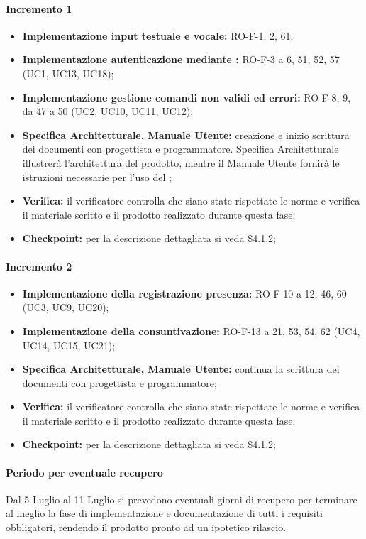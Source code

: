 \paragraph{Incremento 1}
\begin{itemize}
    \item \textbf{Implementazione input testuale e vocale:} RO-F-1, 2, 61;
    \item \textbf{Implementazione autenticazione mediante :} RO-F-3 a 6, 51, 52, 57 (UC1, UC13, UC18);
    \item \textbf{Implementazione gestione comandi non validi ed errori:} RO-F-8, 9, da 47 a 50 (UC2, UC10, UC11, UC12);
    \item \textbf{Specifica Architetturale, Manuale Utente:} creazione e inizio scrittura dei documenti con progettista e programmatore. Specifica Architetturale illustrerà l'architettura del prodotto, mentre il Manuale Utente fornirà le istruzioni necessarie per l'uso del ;
    \item \textbf{Verifica:} il verificatore controlla che siano state rispettate le norme e verifica il materiale scritto e il prodotto realizzato durante questa fase;
    \item \textbf{Checkpoint:} per la descrizione dettagliata si veda \$4.1.2;
\end{itemize}

\paragraph{Incremento 2}
\begin{itemize}
    \item \textbf{Implementazione della registrazione presenza:} RO-F-10 a 12, 46, 60 (UC3, UC9, UC20);
    \item \textbf{Implementazione della consuntivazione:} RO-F-13 a 21, 53, 54, 62 (UC4, UC14, UC15, UC21);
    \item \textbf{Specifica Architetturale, Manuale Utente:} continua la scrittura dei documenti con progettista e programmatore;
    \item \textbf{Verifica:} il verificatore controlla che siano state rispettate le norme e verifica il materiale scritto e il prodotto realizzato durante questa fase;
    \item \textbf{Checkpoint:} per la descrizione dettagliata si veda \$4.1.2;
\end{itemize}

\paragraph*{Periodo per eventuale recupero}
Dal 5 Luglio al 11 Luglio si prevedono eventuali giorni di recupero per terminare al meglio la fase di implementazione e documentazione di tutti i requisiti obbligatori, rendendo il prodotto pronto ad un ipotetico rilascio.

